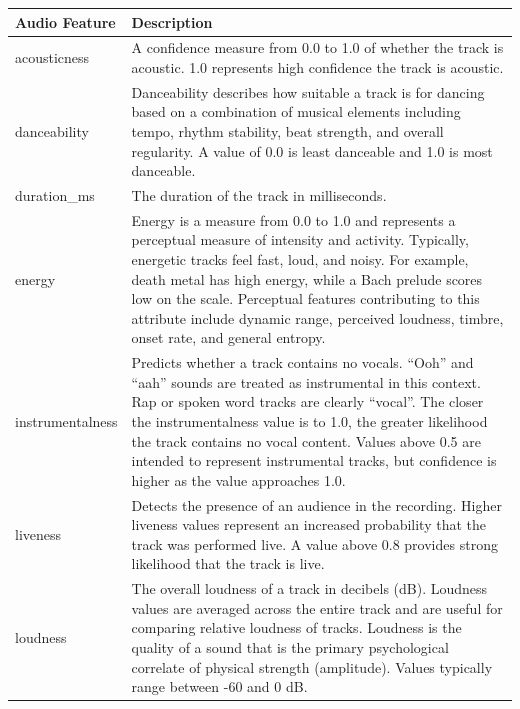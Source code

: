 \documentclass{article}
\begin{document}
\begin{table}[htbp]
    \centering
    \begin{tabular}{l p{}}
        \toprule
        \textbf{Audio Feature} & \textbf{Description} \\
        \midrule

        acousticness & A confidence measure from 0.0 to 1.0 of whether the track is acoustic. 1.0 represents high confidence the track is acoustic. \\[3pt]

        danceability & Danceability describes how suitable a track is for dancing based on a combination of musical elements including tempo, rhythm stability, beat strength, and overall regularity. A value of 0.0 is least danceable and 1.0 is most danceable. \\[3pt]

        duration\_ms & The duration of the track in milliseconds. \\[3pt]

        energy & Energy is a measure from 0.0 to 1.0 and represents a perceptual measure of intensity and activity. Typically, energetic tracks feel fast, loud, and noisy. For example, death metal has high energy, while a Bach prelude scores low on the scale. Perceptual features contributing to this attribute include dynamic range, perceived loudness, timbre, onset rate, and general entropy. \\[3pt]

        instrumentalness & Predicts whether a track contains no vocals. ``Ooh'' and ``aah'' sounds are treated as instrumental in this context. Rap or spoken word tracks are clearly ``vocal''. The closer the instrumentalness value is to 1.0, the greater likelihood the track contains no vocal content. Values above 0.5 are intended to represent instrumental tracks, but confidence is higher as the value approaches 1.0. \\[3pt]

        liveness & Detects the presence of an audience in the recording. Higher liveness values represent an increased probability that the track was performed live. A value above 0.8 provides strong likelihood that the track is live. \\[3pt]

        loudness & The overall loudness of a track in decibels (dB). Loudness values are averaged across the entire track and are useful for comparing relative loudness of tracks. Loudness is the quality of a sound that is the primary psychological correlate of physical strength (amplitude). Values typically range between -60 and 0 dB. \\[3pt]


\end{tabular}
\end{table}
\end{document}
